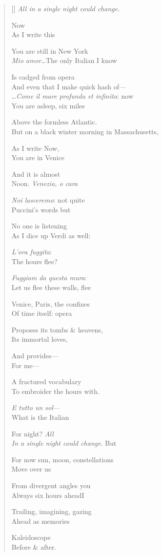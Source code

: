 \label{ch:e_tutto}
\settowidth{\versewidth}{But on a black winter morning in Massachusetts,}
\begin{verse}[\versewidth]
\textit{All in a single night could change.}

Now\\
As I write this

You are still in New York\\
\textit{Mio amor}\ldots The only Italian I know

Is cadged from opera\\
And even that I make quick hash of---\\
\ldots \textit{Come il mare profunda et infinita}: now\\
You are asleep, six miles

Above the formless Atlantic.\\
But on a black winter morning in Massachusetts,

As I write Now,\\
You are in Venice

And it is almost\\
Noon. \textit{Venezia, o cara}

\textit{Noi lasceremo}: not quite\\
Puccini's words but

No one is listening\\
As I dice up Verdi as well:

\textit{L'ora fuggita}:\\
The hours flee?  

\textit{Fuggiam da questa mura}:\\
Let us flee these walls, flee

Venice, Paris, the confines\\
Of time itself: opera

Proposes its tombs \& heavens,\\
Its immortal loves,

And provides---\\
For me---

A fractured vocabulary\\
To embroider the hours with.

\textit{E tutto un sol}---\\
What is the Italian

For night? \textit{All\\
In a single night could change}. But

For now sun, moon, constellations\\
Move over us

From divergent angles \qquad you\\
Always six hours ahead\qquad I

Trailing, imagining, gazing\\
Ahead as memories

Kaleidoscope\\
Before \& after.
\end{verse}
